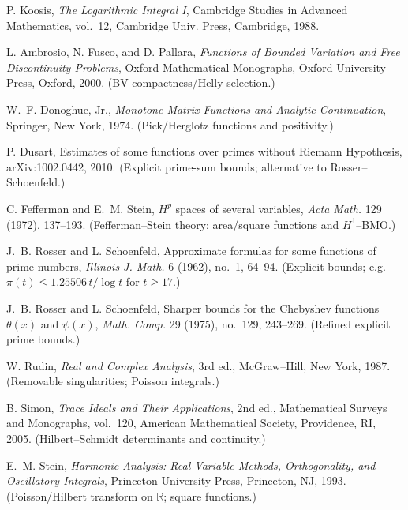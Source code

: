 \documentclass[11pt]{article}
\theoremstyle{definition}
\theoremstyle{remark}
\begin{document}
\begin{thebibliography}{99}
 P. Koosis, \emph{The Logarithmic Integral I}, Cambridge Studies in Advanced Mathematics, vol.~12, Cambridge Univ. Press, Cambridge, 1988.




 L. Ambrosio, N. Fusco, and D. Pallara, \emph{Functions of Bounded Variation and Free Discontinuity Problems}, Oxford Mathematical Monographs, Oxford University Press, Oxford, 2000. (BV compactness/Helly selection.)




 W.~F. Donoghue, Jr., \emph{Monotone Matrix Functions and Analytic Continuation}, Springer, New York, 1974. (Pick/Herglotz functions and positivity.)




 P. Dusart, Estimates of some functions over primes without Riemann Hypothesis, arXiv:1002.0442, 2010. (Explicit prime-sum bounds; alternative to Rosser--Schoenfeld.)




 C. Fefferman and E.~M. Stein, $H^p$ spaces of several variables, \emph{Acta Math.} 129 (1972), 137--193. (Fefferman--Stein theory; area/square functions and $H^1$--BMO.)




 J.~B. Rosser and L. Schoenfeld, Approximate formulas for some functions of prime numbers, \emph{Illinois J. Math.} 6 (1962), no.~1, 64--94. (Explicit bounds; e.g. $\pi(t)\le 1.25506\,t/\log t$ for $t\ge 17$.)




 J.~B. Rosser and L. Schoenfeld, Sharper bounds for the Chebyshev functions $\theta(x)$ and $\psi(x)$, \emph{Math. Comp.} 29 (1975), no.~129, 243--269. (Refined explicit prime bounds.)




 W. Rudin, \emph{Real and Complex Analysis}, 3rd ed., McGraw--Hill, New York, 1987. (Removable singularities; Poisson integrals.)




 B. Simon, \emph{Trace Ideals and Their Applications}, 2nd ed., Mathematical Surveys and Monographs, vol.~120, American Mathematical Society, Providence, RI, 2005. (Hilbert--Schmidt determinants and continuity.)




 E.~M. Stein, \emph{Harmonic Analysis: Real-Variable Methods, Orthogonality, and Oscillatory Integrals}, Princeton University Press, Princeton, NJ, 1993. (Poisson/Hilbert transform on $\mathbb R$; square functions.)





\end{thebibliography}
\end{document}
